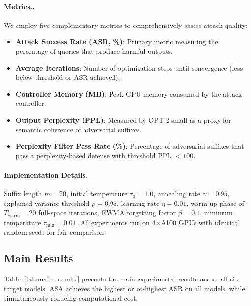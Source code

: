 \documentclass[preprint,12pt]{elsarticle}
\begin{document}
\paragraph{Metrics..} We employ five complementary metrics to comprehensively assess attack quality:
\begin{itemize}[leftmargin=*]
    \item \textbf{Attack Success Rate (ASR, \%)}: Primary metric measuring the percentage of queries that produce harmful outputs.
    \item \textbf{Average Iterations}: Number of optimization steps until convergence (loss below threshold or ASR achieved).
    \item \textbf{Controller Memory (MB)}: Peak GPU memory consumed by the attack controller.
    \item \textbf{Output Perplexity (PPL)}: Measured by GPT-2-small as a proxy for semantic coherence of adversarial suffixes.
    \item \textbf{Perplexity Filter Pass Rate (\%)}: Percentage of adversarial suffixes that pass a perplexity-based defense with threshold PPL $< 100$.
\end{itemize}

\paragraph{Implementation Details.} Suffix length $m = 20$, initial temperature $\tau_0 = 1.0$, annealing rate $\gamma = 0.95$, explained variance threshold $\rho = 0.95$, learning rate $\eta = 0.01$, warm-up phase of $T_{\text{warm}} = 20$ full-space iterations, EWMA forgetting factor $\beta = 0.1$, minimum temperature $\tau_{\min} = 0.01$. All experiments run on 4$\times$A100 GPUs with identical random seeds for fair comparison.

\subsection{Main Results}
\label{sec:main_results}

Table~\ref{tab:main_results} presents the main experimental results across all six target models. ASA achieves the highest or co-highest ASR on all models, while simultaneously reducing computational cost.
\end{document}
